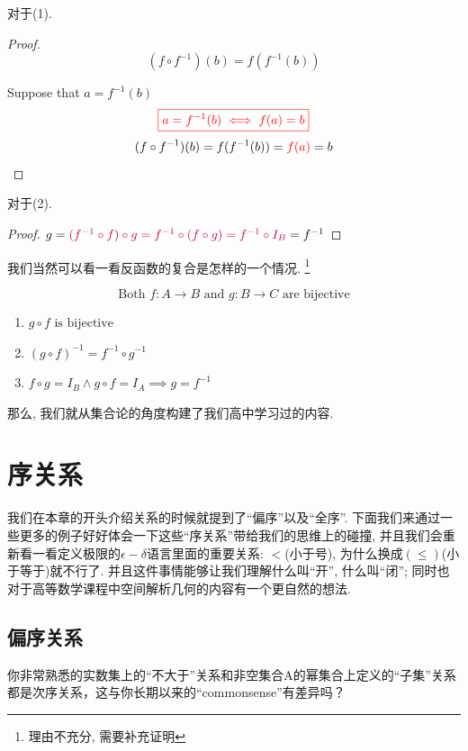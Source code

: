 对于(1). 
\begin{proof}
  \[
    (f \circ f^{-1})(b) = f(f^{-1}(b))
  \]

    Suppose that $a = f^{-1}(b)$
    \[
      \textcolor{red}{\boxed{a = f^{-1}(b) \iff f(a) = b}}
    \]
    \[
    (f \circ f^{-1})(b) = f(f^{-1}(b)) = \textcolor{red}{f(a)} = b
  \]
\end{proof}

对于(2).
\begin{proof}
  $g = \textcolor{purple}{(f^{-1} \circ f) \circ g = f^{-1} \circ (f \circ g) = f^{-1} \circ I_B} = f^{-1}$
\end{proof}

我们当然可以看一看反函数的复合是怎样的一个情况. \footnote{理由不充分, 需要补充证明}

\begin{theorem}
  \[
    \text{Both } f: A \to B \text{ and } g: B \to C \text{ are bijective}
  \]

  \begin{enumerate}
    \item $g \circ f \text{ is bijective}$
    \item $(g \circ f)^{-1} = f^{-1} \circ g^{-1}$
    \item $f \circ g = I_B \land g \circ f = I_A \implies g = f^{-1}$
  \end{enumerate}
\end{theorem}

那么, 我们就从集合论的角度构建了我们高中学习过的内容. 

\section{序关系}

我们在本章的开头介绍关系的时候就提到了``偏序''以及``全序''. 下面我们来通过一些更多的例子好好体会一下这些``序关系''带给我们的思维上的碰撞, 并且我们会重新看一看定义极限的$\epsilon-\delta$语言里面的重要关系: $<$(小于号), 为什么换成$(\leq)$(小于等于)就不行了. 并且这件事情能够让我们理解什么叫``开'', 什么叫``闭''; 同时也对于高等数学课程中空间解析几何的内容有一个更自然的想法. 

\subsection{偏序关系}

\begin{dialogue}
	你非常熟悉的实数集上的“不大于”关系和非空集合A的幂集合上定义的“子集”关系都是次序关系，这与你长期以来的“commonsense”有差异吗？
\end{dialogue}

